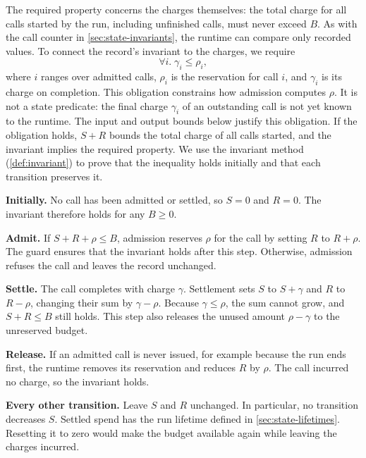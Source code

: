 The required property concerns the charges themselves: the total charge for all calls started by
the run, including unfinished calls, must never exceed $B$. As with the call counter in
\cref{sec:state-invariants}, the runtime can compare only recorded values. To connect the record's
invariant to the charges, we require
\[
  \forall i.\; \gamma_i \leq \rho_i ,
\]
where $i$ ranges over admitted calls, $\rho_i$ is the reservation for call $i$, and $\gamma_i$ is
its charge on completion. This obligation constrains how admission computes $\rho$. It is not a
state predicate: the final charge $\gamma_i$ of an outstanding call is not yet known to the
runtime. The input and output bounds below justify this obligation. If the obligation holds,
$S + R$ bounds the total charge of all calls started, and the invariant implies the required
property. We use the invariant method (\cref{def:invariant}) to prove that the inequality holds
initially and that each transition preserves it.

\bi

\item \textbf{Initially.} No call has been admitted or settled, so $S = 0$ and $R = 0$. The invariant
therefore holds for any $B \geq 0$.

\item \textbf{Admit.} If $S + R + \rho \leq B$, admission reserves $\rho$ for the call by setting
$R$ to $R + \rho$. The guard ensures that the invariant holds after this step. Otherwise,
admission refuses the call and leaves the record unchanged.

\item \textbf{Settle.} The call completes with charge $\gamma$. Settlement sets $S$ to $S + \gamma$
and $R$ to $R - \rho$, changing their sum by $\gamma - \rho$. Because $\gamma \leq \rho$, the sum
cannot grow, and $S + R \leq B$ still holds. This step also releases the unused amount
$\rho - \gamma$ to the unreserved budget.

\item \textbf{Release.} If an admitted call is never issued, for example because the run ends
first, the runtime removes its reservation and reduces $R$ by $\rho$. The call incurred no charge,
so the invariant holds.

\item \textbf{Every other transition.} Leave $S$ and $R$ unchanged. In particular, no transition
decreases $S$. Settled spend has the run lifetime defined in \cref{sec:state-lifetimes}. Resetting
it to zero would make the budget available again while leaving the charges incurred.

